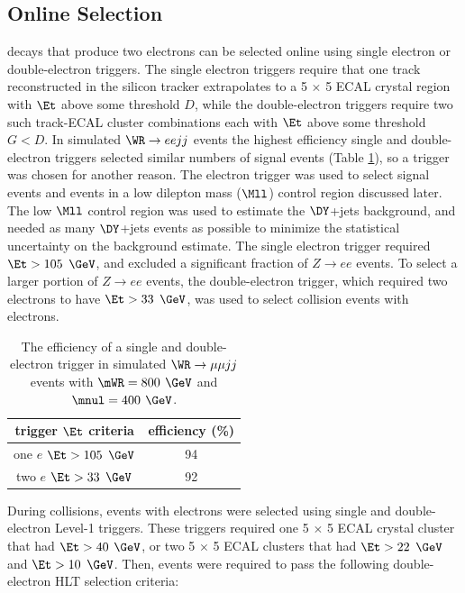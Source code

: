 \subsection{Online Selection}
\WR decays that produce two electrons can be selected online using single electron or double-electron triggers.  The single electron 
triggers require that one track reconstructed in the silicon tracker extrapolates to a 5 $\times$ 5 ECAL crystal region with $\Et$ above some 
threshold $D$, while the double-electron triggers require two such track-ECAL cluster combinations each with $\Et$ above some threshold 
$G < D$.  In simulated $\WR \rightarrow eejj$ events the highest efficiency single and double-electron triggers selected similar numbers 
of signal events (Table \ref{tab:singleVsDblEleHlt}), so a trigger was chosen for another reason.  The electron trigger was used 
to select signal events and events in a low dilepton mass ($\Mll$) control region discussed later.  The low $\Mll$ control region was 
used to estimate the $\DY$+jets background, and needed as many $\DY$+jets events as possible to minimize the statistical uncertainty 
on the background estimate.  The single electron trigger required $\Et > 105$ $\GeV$, and excluded a significant fraction of 
$Z \rightarrow ee$ events.  To select a larger portion of $Z \rightarrow ee$ events, the double-electron trigger, which required two 
electrons to have $\Et > 33$ $\GeV$, was used to select collision events with electrons.

\begin{table}[h]
	\caption{The efficiency of a single and double-electron trigger in simulated $\WR \rightarrow \mu\mu jj$ events with $\mWR = 800$ $\GeV$ 
		and $\mnul = 400$ $\GeV$.}
	\label{tab:singleVsDblEleHlt}
	\centering
	\begin{tabular}{c|c}
		trigger $\Et$ criteria & efficiency (\%) \\  \hline
		one $e$ $\Et >105$ $\GeV$ & 94  \\ 
		two $e$ $\Et >33$ $\GeV$ & 92  \\
	\end{tabular}
\end{table}

During collisions, events with electrons were selected using single and double-electron Level-1 triggers.  These triggers required 
one 5 $\times$ 5 ECAL crystal cluster that had $\Et > 40$ $\GeV$, or two 5 $\times$ 5 ECAL clusters that had 
$\Et > 22$ $\GeV$ and $\Et > 10$ $\GeV$.  Then, events were required to pass the following double-electron HLT selection criteria:

